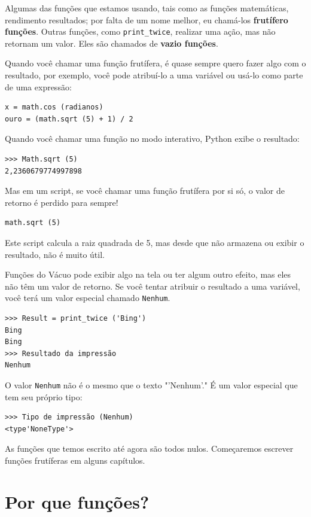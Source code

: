 \documentclass[10pt]{book}
\begin{document}
\begin{exercise}
Algumas das funções que estamos usando, tais como as funções matemáticas, rendimento
resultados; por falta de um nome melhor, eu chamá-los {\bf frutífero
  funções}. Outras funções, como \verb "print_twice", realizar uma
ação, mas não retornam um valor. Eles são chamados de {\bf vazio
  funções}.

Quando você chamar uma função frutífera, é quase sempre
quero fazer algo com o resultado, por exemplo, você pode
atribuí-lo a uma variável ou usá-lo como parte de uma expressão:

\begin{verbatim}
x = math.cos (radianos)
ouro = (math.sqrt (5) + 1) / 2
\end{verbatim}
%
Quando você chamar uma função no modo interativo, Python exibe
o resultado:

\begin{verbatim}
>>> Math.sqrt (5)
2,2360679774997898
\end{verbatim}
%
Mas em um script, se você chamar uma função frutífera por si só,
o valor de retorno é perdido para sempre!

\begin{verbatim}
math.sqrt (5)
\end{verbatim}
%
Este script calcula a raiz quadrada de 5, mas desde que não armazena
ou exibir o resultado, não é muito útil.

Funções do Vácuo pode exibir algo na tela ou ter algum
outro efeito, mas eles não têm um valor de retorno. Se você tentar
atribuir o resultado a uma variável, você terá um valor especial chamado
{\tt Nenhum}.

\begin{verbatim}
>>> Result = print_twice ('Bing')
Bing
Bing
>>> Resultado da impressão
Nenhum
\end{verbatim}
%
O valor {\tt Nenhum} não é o mesmo que o texto \verbo "'Nenhum'." 
É um valor especial que tem seu próprio tipo:

\begin{verbatim}
>>> Tipo de impressão (Nenhum)
<type'NoneType'>
\end{verbatim}
%
As funções que temos escrito até agora são todos nulos. Começaremos
escrever funções frutíferas em alguns capítulos.


\section{Por que funções?}


\end{exercise}
\end{document}
